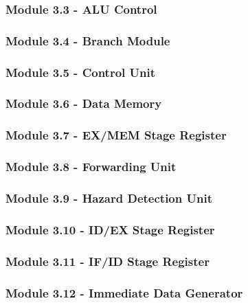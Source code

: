 \documentclass[12pt]{article}
\begin{document}
\subsubsection*{\large Module 3.3 - ALU Control}

\subsubsection*{\large Module 3.4 - Branch Module}

\subsubsection*{\large Module 3.5 - Control Unit}

\subsubsection*{\large Module 3.6 - Data Memory}

\subsubsection*{\large Module 3.7 - EX/MEM Stage Register}

\subsubsection*{\large Module 3.8 - Forwarding Unit}

\subsubsection*{\large Module 3.9 - Hazard Detection Unit}

\subsubsection*{\large Module 3.10 - ID/EX Stage Register}

\subsubsection*{\large Module 3.11 - IF/ID Stage Register}

\subsubsection*{\large Module 3.12 - Immediate Data Generator}

\end{document}

